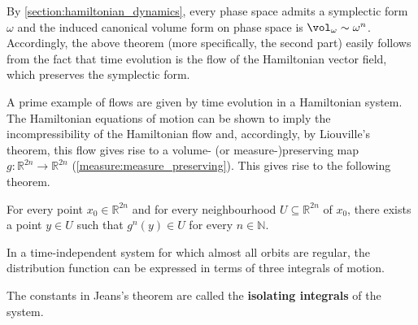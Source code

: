    \begin{remark}[$\clubsuit$]
        By \cref{section:hamiltonian_dynamics}, every phase space admits a symplectic form $\omega$ and the induced canonical volume form on phase space is $\vol_\omega\sim\omega^n$. Accordingly, the above theorem (more specifically, the second part) easily follows from the fact that time evolution is the flow of the Hamiltonian vector field, which preserves the symplectic form.
    \end{remark}


    A prime example of flows are given by time evolution in a Hamiltonian system. The Hamiltonian equations of motion can be shown to imply the incompressibility of the Hamiltonian flow and, accordingly, by Liouville's theorem, this flow gives rise to a volume- (or measure-)preserving map $g:\mathbb{R}^{2n}\rightarrow\mathbb{R}^{2n}$ (\cref{measure:measure_preserving}). This gives rise to the following theorem.
    \begin{theorem}
        For every point $x_0\in\mathbb{R}^{2n}$ and for every neighbourhood $U\subseteq\mathbb{R}^{2n}$ of $x_0$, there exists a point $y\in U$ such that $g^n(y)\in U$ for every $n\in\mathbb{N}$.
    \end{theorem}

    \begin{theorem}
        In a time-independent system for which almost all orbits are regular, the distribution function can be expressed in terms of three integrals of motion.
    \end{theorem}
    The constants in Jeans's theorem are called the \textup{\textbf{isolating integrals}} of the system.

